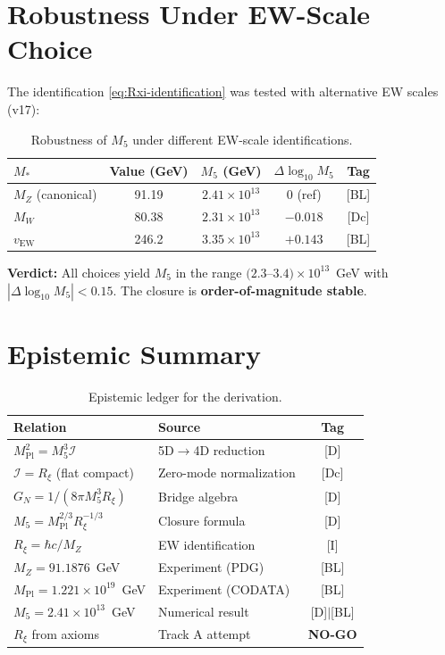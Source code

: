 \documentclass[11pt,a4paper]{article}
\newcommand{\Rxi}{R_\xi}
\newcommand{\Mpl}{M_{\mathrm{Pl}}}
\newcommand{\Mfive}{M_5}
\newcommand{\MZ}{M_Z}
\newcommand{\MW}{M_W}
\newcommand{\vEW}{v_{\mathrm{EW}}}
\newcommand{\calI}{\mathcal{I}}
\newcommand{\GN}{G_N}
\begin{document}
\section{Robustness Under EW-Scale Choice}

The identification \eqref{eq:Rxi-identification} was tested with alternative
EW scales (v17):

\begin{table}[h]
\centering
\caption{Robustness of $\Mfive$ under different EW-scale identifications.}
\label{tab:robustness}
\begin{tabular}{@{}lcccc@{}}
\toprule
$M_*$ & Value (GeV) & $\Mfive$ (GeV) & $\Delta\log_{10}\Mfive$ & Tag \\
\midrule
$\MZ$ (canonical) & 91.19 & $2.41 \times 10^{13}$ & 0 (ref) & [BL] \\
$\MW$ & 80.38 & $2.31 \times 10^{13}$ & $-0.018$ & [Dc] \\
$\vEW$ & 246.2 & $3.35 \times 10^{13}$ & $+0.143$ & [BL] \\
\bottomrule
\end{tabular}
\end{table}

\textbf{Verdict:} All choices yield $\Mfive$ in the range
$(2.3$--$3.4) \times 10^{13}$~GeV with $|\Delta\log_{10}\Mfive| < 0.15$.
The closure is \textbf{order-of-magnitude stable}.

\section{Epistemic Summary}

\begin{table}[h]
\centering
\caption{Epistemic ledger for the derivation.}
\label{tab:ledger}
\begin{tabular}{@{}llc@{}}
\toprule
Relation & Source & Tag \\
\midrule
$\Mpl^2 = \Mfive^3 \calI$ & 5D$\to$4D reduction & [D] \\
$\calI = \Rxi$ (flat compact) & Zero-mode normalization & [Dc] \\
$\GN = 1/(8\pi\Mfive^3\Rxi)$ & Bridge algebra & [D] \\
$\Mfive = \Mpl^{2/3}\Rxi^{-1/3}$ & Closure formula & [D] \\
$\Rxi = \hbar c/\MZ$ & EW identification & [I] \\
$\MZ = 91.1876$~GeV & Experiment (PDG) & [BL] \\
$\Mpl = 1.221 \times 10^{19}$~GeV & Experiment (CODATA) & [BL] \\
$\Mfive = 2.41 \times 10^{13}$~GeV & Numerical result & [D]$|$[BL] \\
$\Rxi$ from axioms & Track A attempt & \textbf{NO-GO} \\
\bottomrule
\end{tabular}
\end{table}
\end{document}
